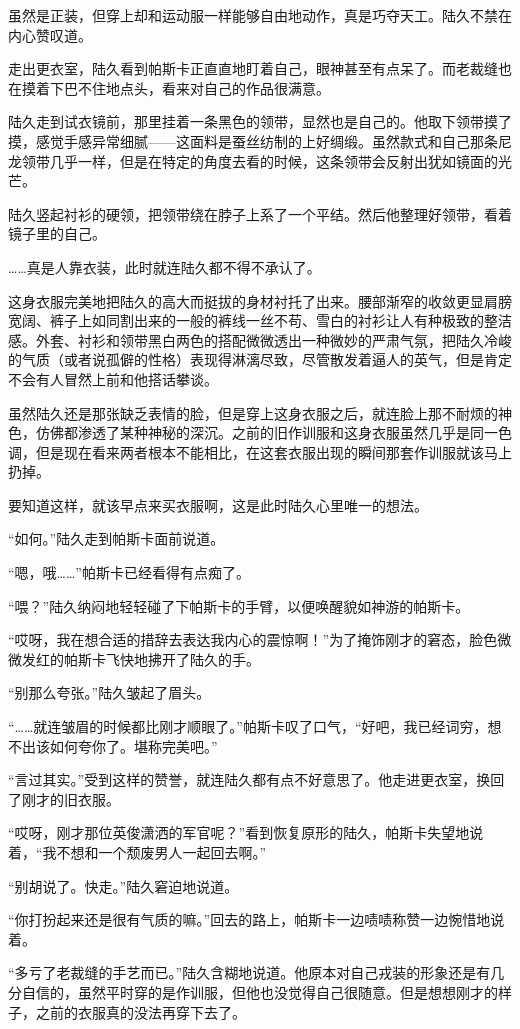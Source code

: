 虽然是正装，但穿上却和运动服一样能够自由地动作，真是巧夺天工。陆久不禁在内心赞叹道。

走出更衣室，陆久看到帕斯卡正直直地盯着自己，眼神甚至有点呆了。而老裁缝也在摸着下巴不住地点头，看来对自己的作品很满意。

陆久走到试衣镜前，那里挂着一条黑色的领带，显然也是自己的。他取下领带摸了摸，感觉手感异常细腻——这面料是蚕丝纺制的上好绸缎。虽然款式和自己那条尼龙领带几乎一样，但是在特定的角度去看的时候，这条领带会反射出犹如镜面的光芒。

陆久竖起衬衫的硬领，把领带绕在脖子上系了一个平结。然后他整理好领带，看着镜子里的自己。

……真是人靠衣装，此时就连陆久都不得不承认了。

这身衣服完美地把陆久的高大而挺拔的身材衬托了出来。腰部渐窄的收敛更显肩膀宽阔、裤子上如同割出来的一般的裤线一丝不苟、雪白的衬衫让人有种极致的整洁感。外套、衬衫和领带黑白两色的搭配微微透出一种微妙的严肃气氛，把陆久冷峻的气质（或者说孤僻的性格）表现得淋漓尽致，尽管散发着逼人的英气，但是肯定不会有人冒然上前和他搭话攀谈。

虽然陆久还是那张缺乏表情的脸，但是穿上这身衣服之后，就连脸上那不耐烦的神色，仿佛都渗透了某种神秘的深沉。之前的旧作训服和这身衣服虽然几乎是同一色调，但是现在看来两者根本不能相比，在这套衣服出现的瞬间那套作训服就该马上扔掉。

要知道这样，就该早点来买衣服啊，这是此时陆久心里唯一的想法。

“如何。”陆久走到帕斯卡面前说道。

“嗯，哦……”帕斯卡已经看得有点痴了。

“喂？”陆久纳闷地轻轻碰了下帕斯卡的手臂，以便唤醒貌如神游的帕斯卡。

“哎呀，我在想合适的措辞去表达我内心的震惊啊！”为了掩饰刚才的窘态，脸色微微发红的帕斯卡飞快地拂开了陆久的手。

“别那么夸张。”陆久皱起了眉头。

“……就连皱眉的时候都比刚才顺眼了。”帕斯卡叹了口气，“好吧，我已经词穷，想不出该如何夸你了。堪称完美吧。”

“言过其实。”受到这样的赞誉，就连陆久都有点不好意思了。他走进更衣室，换回了刚才的旧衣服。

“哎呀，刚才那位英俊潇洒的军官呢？”看到恢复原形的陆久，帕斯卡失望地说着，“我不想和一个颓废男人一起回去啊。”

“别胡说了。快走。”陆久窘迫地说道。

“你打扮起来还是很有气质的嘛。”回去的路上，帕斯卡一边啧啧称赞一边惋惜地说着。

“多亏了老裁缝的手艺而已。”陆久含糊地说道。他原本对自己戎装的形象还是有几分自信的，虽然平时穿的是作训服，但他也没觉得自己很随意。但是想想刚才的样子，之前的衣服真的没法再穿下去了。

